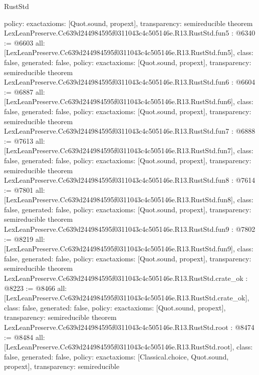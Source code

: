 \begin{lexlean}{RustStd}
\begin{coremodule}
{  policy: exact{axioms: [Quot.sound, propext]},
  transparency: semireducible
}
theorem LexLeanPreserve.Cc639d244984595f0311043c4c505146e.R13.RustStd.fun5 : @6340 := @6603 {
  all: [LexLeanPreserve.Cc639d244984595f0311043c4c505146e.R13.RustStd.fun5],
  class: false,
  generated: false,
  policy: exact{axioms: [Quot.sound, propext]},
  transparency: semireducible
}
theorem LexLeanPreserve.Cc639d244984595f0311043c4c505146e.R13.RustStd.fun6 : @6604 := @6887 {
  all: [LexLeanPreserve.Cc639d244984595f0311043c4c505146e.R13.RustStd.fun6],
  class: false,
  generated: false,
  policy: exact{axioms: [Quot.sound, propext]},
  transparency: semireducible
}
theorem LexLeanPreserve.Cc639d244984595f0311043c4c505146e.R13.RustStd.fun7 : @6888 := @7613 {
  all: [LexLeanPreserve.Cc639d244984595f0311043c4c505146e.R13.RustStd.fun7],
  class: false,
  generated: false,
  policy: exact{axioms: [Quot.sound, propext]},
  transparency: semireducible
}
theorem LexLeanPreserve.Cc639d244984595f0311043c4c505146e.R13.RustStd.fun8 : @7614 := @7801 {
  all: [LexLeanPreserve.Cc639d244984595f0311043c4c505146e.R13.RustStd.fun8],
  class: false,
  generated: false,
  policy: exact{axioms: [Quot.sound, propext]},
  transparency: semireducible
}
theorem LexLeanPreserve.Cc639d244984595f0311043c4c505146e.R13.RustStd.fun9 : @7802 := @8219 {
  all: [LexLeanPreserve.Cc639d244984595f0311043c4c505146e.R13.RustStd.fun9],
  class: false,
  generated: false,
  policy: exact{axioms: [Quot.sound, propext]},
  transparency: semireducible
}
theorem LexLeanPreserve.Cc639d244984595f0311043c4c505146e.R13.RustStd.crate_ok : @8223 := @8466 {
  all: [LexLeanPreserve.Cc639d244984595f0311043c4c505146e.R13.RustStd.crate_ok],
  class: false,
  generated: false,
  policy: exact{axioms: [Quot.sound, propext]},
  transparency: semireducible
}
theorem LexLeanPreserve.Cc639d244984595f0311043c4c505146e.R13.RustStd.root : @8474 := @8484 {
  all: [LexLeanPreserve.Cc639d244984595f0311043c4c505146e.R13.RustStd.root],
  class: false,
  generated: false,
  policy: exact{axioms: [Classical.choice, Quot.sound, propext]},
  transparency: semireducible
}


\end{coremodule}
\end{lexlean}

